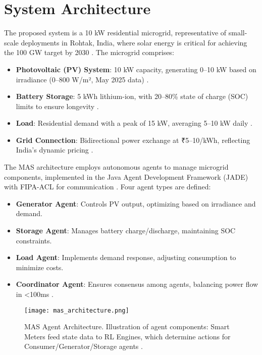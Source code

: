 \documentclass[12pt]{report}
\begin{document}
\section{System Architecture}
\begin{doublespace}
The proposed system is a 10 kW residential microgrid, representative of small-scale deployments in Rohtak, India, where solar energy is critical for achieving the 100 GW target by 2030 \cite{MNRE2023}. The microgrid comprises:
\begin{itemize}
    \item \textbf{Photovoltaic (PV) System}: 10 kW capacity, generating 0–10 kW based on irradiance (0–800 W/m², May 2025 data) \cite{NREL2025}.
    \item \textbf{Battery Storage}: 5 kWh lithium-ion, with 20–80\% state of charge (SOC) limits to ensure longevity \cite{MNRE2023}.
    \item \textbf{Load}: Residential demand with a peak of 15 kW, averaging 5–10 kW daily \cite{MNRE2023}.
    \item \textbf{Grid Connection}: Bidirectional power exchange at ₹5–10/kWh, reflecting India’s dynamic pricing \cite{MNRE2023}.
\end{itemize}
The MAS architecture employs autonomous agents to manage microgrid components, implemented in the Java Agent Development Framework (JADE) with FIPA-ACL for communication \cite{FIPA2020}. Four agent types are defined:
\begin{itemize}
    \item \textbf{Generator Agent}: Controls PV output, optimizing based on irradiance and demand.
    \item \textbf{Storage Agent}: Manages battery charge/discharge, maintaining SOC constraints.
    \item \textbf{Load Agent}: Implements demand response, adjusting consumption to minimize costs.
    \item \textbf{Coordinator Agent}: Ensures consensus among agents, balancing power flow in <100ms \cite{Zhang2021}.
\end{itemize}
\end{doublespace}
\begin{figure}[h]
    \centering
    \texttt{[image: mas\_architecture.png]}
    \caption{MAS Agent Architecture. Illustration of agent components: Smart Meters feed state data to RL Engines, which determine actions for Consumer/Generator/Storage agents \cite{Zhang2021}.}
    \label{fig:mas_architecture}
\end{figure}
\end{document}

